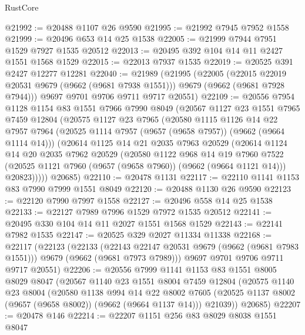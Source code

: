 \begin{lexlean}{RustCore}
\begin{coremodule}
@21992 := @20488 @1107 @26 @9590
@21995 := @21992 @7945 @7952 @1558
@21999 := @20496 @653 @14 @25 @1538
@22005 := @21999 @7944 @7951 @1529 @7927 @1535 @20512
@22013 := @20495 @392 @104 @14 @11 @2427 @1551 @1568 @1529
@22015 := @22013 @7937 @1535
@22019 := @20525 @391 @2427 @12277 @12281
@22040 := @21989
    (@21995
      (@22005
        (@22015 @22019 @20531 @9679 (@9662 (@9681 @7938 @1551)))
        @9679
        (@9662 (@9681 @7928 @7944)))
      @9697
      @9701
      @9706
      @9711
      @9717
      @20551)
@22109 := @20556
    @7954
    @1128
    @1154
    @83
    @1551
    @7966
    @7990
    @8049
    (@20567
      @1127
      @23
      @1551
      @7965
      @7459
      @12804
      (@20575
        @1127
        @23
        @7965
        (@20580
          @1115
          @1126
          @14
          @22
          @7957
          @7964
          (@20525 @1114 @7957 (@9657 (@9658 @7957)) (@9662 (@9664 @1114 @14)))
          (@20614
            @1125
            @14
            @21
            @2035
            @7963
            @20529
            (@20614
              @1124
              @14
              @20
              @2035
              @7962
              @20529
              (@20580
                @1122
                @968
                @14
                @19
                @7960
                @7522
                (@20525 @1121 @7960 (@9657 (@9658 @7960)) (@9662 (@9664 @1121 @14)))
                @20823)))))
      @20685)
@22110 := @20478 @1131
@22117 := @22110 @1141 @1153 @83 @7990 @7999 @1551 @8049
@22120 := @20488 @1130 @26 @9590
@22123 := @22120 @7990 @7997 @1558
@22127 := @20496 @558 @14 @25 @1538
@22133 := @22127 @7989 @7996 @1529 @7972 @1535 @20512
@22141 := @20495 @330 @104 @14 @11 @2027 @1551 @1568 @1529
@22143 := @22141 @7982 @1535
@22147 := @20525 @329 @2027 @11334 @11338
@22168 := @22117
    (@22123
      (@22133
        (@22143 @22147 @20531 @9679 (@9662 (@9681 @7983 @1551)))
        @9679
        (@9662 (@9681 @7973 @7989)))
      @9697
      @9701
      @9706
      @9711
      @9717
      @20551)
@22206 := @20556
    @7999
    @1141
    @1153
    @83
    @1551
    @8005
    @8029
    @8047
    (@20567
      @1140
      @23
      @1551
      @8004
      @7459
      @12804
      (@20575
        @1140
        @23
        @8004
        (@20580
          @1138
          @994
          @14
          @22
          @8002
          @7605
          (@20525 @1137 @8002 (@9657 (@9658 @8002)) (@9662 (@9664 @1137 @14)))
          @21039))
      @20685)
@22207 := @20478 @146
@22214 := @22207 @1151 @256 @83 @8029 @8038 @1551 @8047

\end{coremodule}
\end{lexlean}
